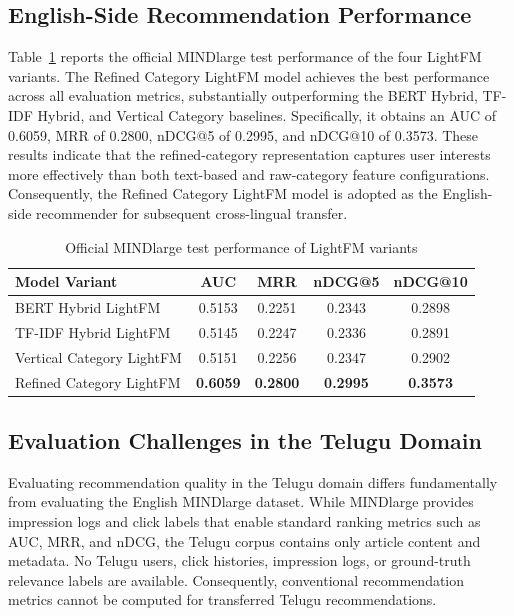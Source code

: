 \documentclass[conference]{IEEEtran}
\begin{document}
\subsection{English-Side Recommendation Performance}

Table~\ref{tab:model_variants} reports the official MINDlarge test performance of the four LightFM variants. The Refined Category LightFM model achieves the best performance across all evaluation metrics, substantially outperforming the BERT Hybrid, TF-IDF Hybrid, and Vertical Category baselines. Specifically, it obtains an AUC of 0.6059, MRR of 0.2800, nDCG@5 of 0.2995, and nDCG@10 of 0.3573. These results indicate that the refined-category representation captures user interests more effectively than both text-based and raw-category feature configurations. Consequently, the Refined Category LightFM model is adopted as the English-side recommender for subsequent cross-lingual transfer.

\begin{table}[t]
\centering
\caption{Official MINDlarge test performance of LightFM variants}
\label{tab:model_variants}
\small
\begin{tabular}{lcccc}
\toprule
Model Variant & AUC & MRR & nDCG@5 & nDCG@10 \\
\midrule
BERT Hybrid LightFM      & 0.5153 & 0.2251 & 0.2343 & 0.2898 \\
TF-IDF Hybrid LightFM    & 0.5145 & 0.2247 & 0.2336 & 0.2891 \\
Vertical Category LightFM & 0.5151 & 0.2256 & 0.2347 & 0.2902 \\
Refined Category LightFM & \textbf{0.6059} & \textbf{0.2800} & \textbf{0.2995} & \textbf{0.3573} \\
\bottomrule
\end{tabular}
\end{table}
\subsection{Evaluation Challenges in the Telugu Domain}

Evaluating recommendation quality in the Telugu domain differs fundamentally from evaluating the English MINDlarge dataset. While MINDlarge provides impression logs and click labels that enable standard ranking metrics such as AUC, MRR, and nDCG, the Telugu corpus contains only article content and metadata. No Telugu users, click histories, impression logs, or ground-truth relevance labels are available. Consequently, conventional recommendation metrics cannot be computed for transferred Telugu recommendations.
\end{document}
